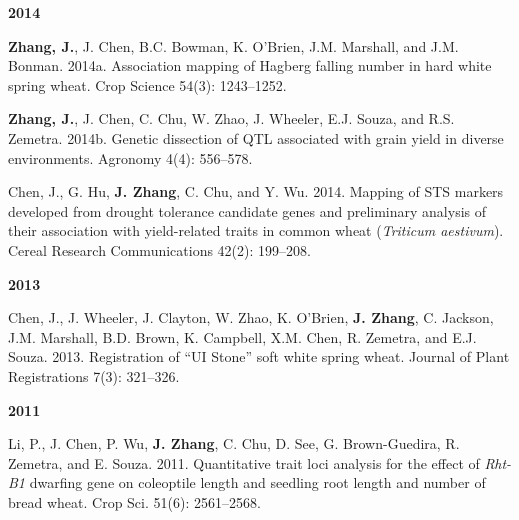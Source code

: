 \begin{cventries}
{\begin{cvitems}
\end{cvitems}
}
\cventry
{\textbf{2014}}
{}
{}
{}
{
\begin{cvitems}
\setlength\itemsep{0.5em}
	\item {\textbf{Zhang, J.}, J. Chen, B.C. Bowman, K. O’Brien, J.M. Marshall, and J.M. Bonman. 2014a. Association mapping of Hagberg falling number in hard white spring wheat. Crop Science 54(3): 1243–1252.}
	\item {\textbf{Zhang, J.}, J. Chen, C. Chu, W. Zhao, J. Wheeler, E.J. Souza, and R.S. Zemetra. 2014b. Genetic dissection of QTL associated with grain yield in diverse environments. Agronomy 4(4): 556–578.}
	\item {Chen, J., G. Hu, \textbf{J. Zhang}, C. Chu, and Y. Wu. 2014. Mapping of STS markers developed from drought tolerance candidate genes and preliminary analysis of their association with yield-related traits in common wheat (\emph{Triticum aestivum}). Cereal Research Communications 42(2): 199–208.}
\end{cvitems}
}
\cventry
{\textbf{2013}}
{}
{}
{}
{
\begin{cvitems}		
	\item {Chen, J., J. Wheeler, J. Clayton, W. Zhao, K. O’Brien, \textbf{J. Zhang}, C. Jackson, J.M. Marshall, B.D. Brown, K. Campbell, X.M. Chen, R. Zemetra, and E.J. Souza. 2013. Registration of “UI Stone” soft white spring wheat. Journal of Plant Registrations 7(3): 321–326.}
\end{cvitems}
}
\cventry
{\textbf{2011}}
{}
{}
{}
{
\begin{cvitems}
\setlength\itemsep{0.5em}
	\item {Li, P., J. Chen, P. Wu, \textbf{J. Zhang}, C. Chu, D. See, G. Brown-Guedira, R. Zemetra, and E. Souza. 2011. Quantitative trait loci analysis for the effect of \emph{Rht-B1} dwarfing gene on coleoptile length and seedling root length and number of bread wheat. Crop Sci. 51(6): 2561–2568.}
\end{cvitems}
}
\end{cventries}

